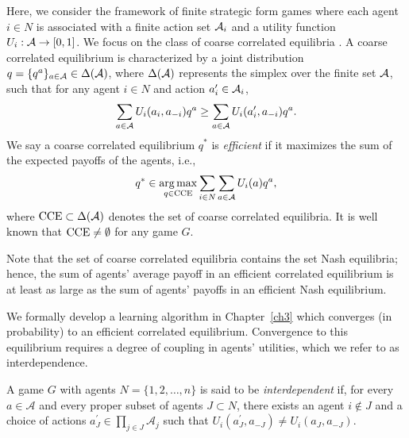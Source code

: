 \bigskip


Here, we consider the framework of finite strategic form games where each agent $i \in N$ is associated with a finite action set ${\cal A}_i$ and a utility function $U_i : {\cal A} \rightarrow [0,1]$.
%
%
We focus on the class of coarse correlated equilibria \cite{Aumann1987}.  A coarse correlated equilibrium is characterized by a joint distribution $q = \{q^a\}_{a \in {\cal A}} \in \Delta({\cal A})$, where $\Delta({\cal A})$ represents the simplex over the finite set ${\cal A}$, such that for any agent $i \in N$ and action $a_i' \in {\cal A}_i$,
%
\begin{equation} 
\sum_{a \in {\cal A}} U_i(a_i, a_{-i}) q^a \geq \sum_{a \in {\cal A}} U_i(a_i', a_{-i}) q^a.
\end{equation}
%
We say a coarse correlated equilibrium $q^*$ is {\it efficient} if it maximizes the sum of the expected payoffs of the agents, i.e., 
%
\begin{equation}
%
q^* \in \underset{q \in {\rm CCE}}{\arg \max} \sum_{i \in N} \sum_{a \in \aee} U_i(a) q^a,
%
\end{equation}  
%
where ${\rm CCE} \subset \Delta({\cal A})$ denotes the set of coarse correlated equilibria.  It is well known that ${\rm CCE} \neq \emptyset$ for any game $G$.

Note that the set of coarse correlated equilibria contains the set Nash equilibria; hence, the sum of agents' average payoff in an efficient correlated equilibrium is at least as large as the sum of agents' payoffs in an efficient Nash equilibrium.

We formally develop a learning algorithm in Chapter~\ref{ch3} which converges (in probability) to an efficient correlated equilibrium. Convergence to this equilibrium requires a degree of coupling in agents' utilities, which we refer to as interdependence.


\begin{defn}
A game $G$ with agents $N = \{1,2,\ldots,n\}$ is said to be \emph{interdependent} if, for every $a\in\mathcal{A}$ and every proper subset of agents $J\subset N$, there exists an agent $i\notin J$ and a choice of actions $a_J^\prime\in\prod_{j\in J} \mathcal{A}_j$ such that $U_i(a_J^\prime,a_{-J})\neq U_i(a_J,a_{-J}).$
\end{defn}

